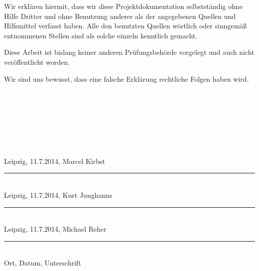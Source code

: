 \documentclass[a4paper,12pt]{article}
\begin{document}
\begin{flushleft}
Wir erklären hiermit, dass wir diese Projektdokumentation selbstständig ohne Hilfe Dritter und ohne Benutzung anderer als der angegebenen Quellen und Hilfsmittel verfasst haben. Alle den benutzten Quellen wörtlich oder sinngemäß entnommenen Stellen sind als solche einzeln kenntlich gemacht.

Diese Arbeit ist bislang keiner anderen Prüfungsbehörde vorgelegt und auch nicht veröffentlicht worden.

Wir sind uns bewusst, dass eine falsche Erklärung rechtliche Folgen haben wird. 
\begin{verbatim}







\end{verbatim}
Leipzig, 11.7.2014, Marcel Kirbst
\hrule width .6\hsize\ \\
Leipzig, 11.7.2014, Kurt Junghanns
\hrule width .6\hsize\ \\
Leipzig, 11.7.2014, Michael Reher
\hrule width .6\hsize\ \\
Ort, Datum, Unterschrift
\end{flushleft}
\end{document}
